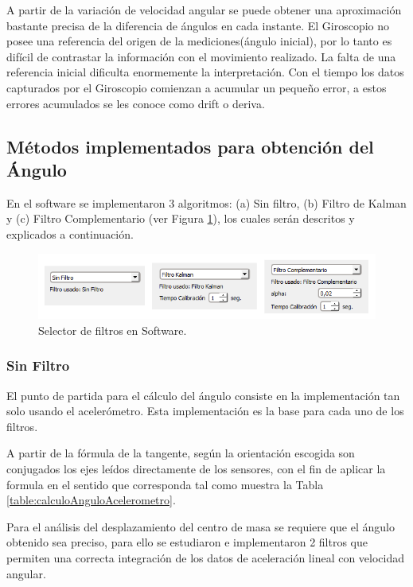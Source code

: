 \documentclass[12pt,a4paper]{article}
\begin{document}
A partir de la variación de velocidad angular se puede obtener una aproximación bastante precisa de la diferencia de ángulos en cada instante.
El Giroscopio no posee una referencia del origen de la mediciones(ángulo inicial), por lo tanto es difícil de contrastar la información con el movimiento realizado.
La falta de una referencia inicial dificulta enormemente la interpretación. Con el tiempo los datos capturados por el Giroscopio comienzan a acumular un pequeño error, a estos errores acumulados se les conoce como drift o deriva.

\subsection{Métodos implementados para obtención del Ángulo}
En el software se implementaron 3 algoritmos: (a) Sin filtro, (b) Filtro de Kalman y (c) Filtro Complementario (ver Figura \ref{fig:selectorFiltros}), los cuales serán descritos y explicados a continuación.
	
\begin{figure}[H]
\centering
	\includegraphics[scale=0.9]{images/implementacionFiltros}
	\caption{Selector de filtros en Software.}
\label{fig:selectorFiltros}
\end{figure}

\subsubsection{Sin Filtro} El punto de partida para el cálculo del ángulo consiste en la implementación tan solo usando el acelerómetro. Esta implementación es la base para cada uno de los filtros.

A partir de la fórmula de la tangente, según la orientación escogida son conjugados los ejes leídos directamente de los sensores, con el fin de aplicar la formula en el sentido que corresponda tal como muestra la Tabla \ref{table:calculoAnguloAcelerometro}.


Para el análisis del desplazamiento del centro de masa se requiere que el ángulo obtenido sea preciso, para ello se estudiaron e implementaron 2 filtros que permiten una correcta integración de los datos de aceleración lineal con velocidad angular.
\end{document}
